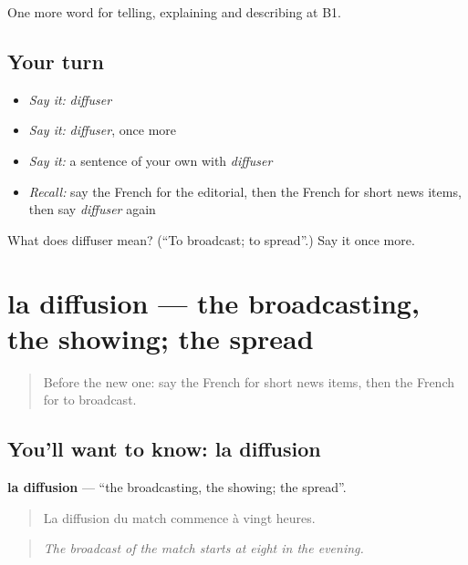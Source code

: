\begin{grammarlens}[title={What you've built}]
One more word for telling, explaining and describing at B1.
\end{grammarlens}

\subsection*{Your turn}
\begin{itemize}
\raggedright
  \item \emph{Say it:} \emph{diffuser}
  \item \emph{Say it:} \emph{diffuser}, once more
  \item \emph{Say it:} a sentence of your own with \emph{diffuser}
  \item \emph{Recall:} say the French for the editorial, then the French for short news items, then say \emph{diffuser} again
\end{itemize}

\begin{tcolorbox}[breakable,colback=teal!4,colframe=teal!35!black,title={Before you move on}]
What does diffuser mean? (\textquotedblleft{}To broadcast; to spread\textquotedblright{}.) Say it once more.
\end{tcolorbox}
\section[la diffusion]{la diffusion — the broadcasting, the showing; the spread}

\label{lesson:FR-C283-diffusion}



\begin{quote}
Before the new one: say the French for short news items, then the French for to broadcast.
\end{quote}

\subsection*{You'll want to know: la diffusion}
\textbf{la diffusion} — \textquotedblleft{}the broadcasting, the showing; the spread\textquotedblright{}.

\begin{quote}
La diffusion du match commence à vingt heures.
\end{quote}

\begin{quote}
\emph{The broadcast of the match starts at eight in the evening.}
\end{quote}

